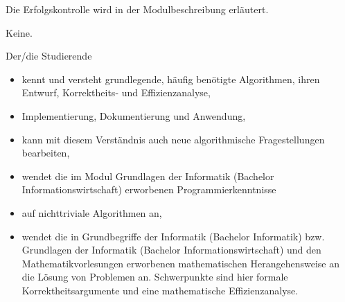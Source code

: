 \begin{course}

\setdoclanguagegerman
{}



\coursehead


\label{cour_7017.dp_997}


\begin{styleenv}
\begin{assessment}
Die Erfolgskontrolle wird in der Modulbeschreibung erläutert.


\end{assessment}

\begin{conditions}Keine.\end{conditions}


\end{styleenv}

\begin{learningoutcomes}
Der/die Studierende

 \begin{itemize}\item kennt und versteht grundlegende, häufig benötigte Algorithmen, ihren Entwurf, Korrektheits- und Effizienzanalyse,  \item Implementierung, Dokumentierung und Anwendung,  \item kann mit diesem Verständnis auch neue algorithmische Fragestellungen bearbeiten,  \item wendet die im Modul Grundlagen der Informatik (Bachelor Informationswirtschaft) erworbenen Programmierkenntnisse  \item auf nichttriviale Algorithmen an,  \item wendet die in Grundbegriffe der Informatik (Bachelor Informatik) bzw. Grundlagen der Informatik (Bachelor Informationswirtschaft) und den Mathematikvorlesungen erworbenen mathematischen Herangehensweise an die Lösung von Problemen an. Schwerpunkte sind hier formale Korrektheitsargumente und eine mathematische Effizienzanalyse.  \end{itemize}
\end{learningoutcomes}


\end{course}
